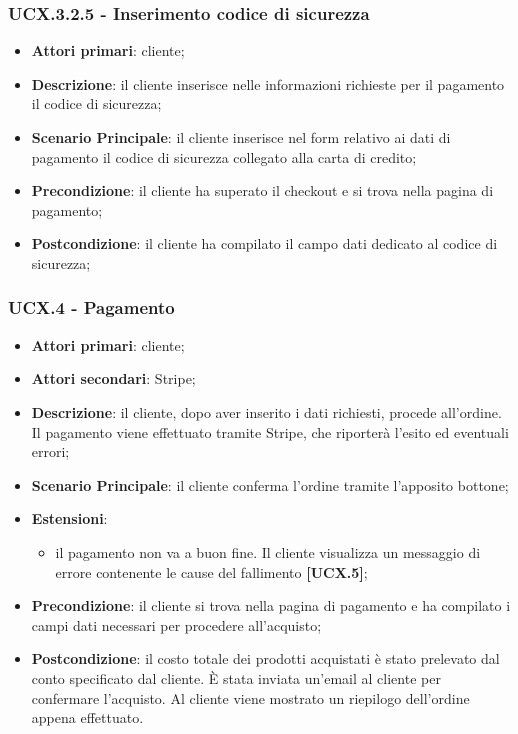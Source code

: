 \subsubsection{UCX.3.2.5 - Inserimento codice di sicurezza}
\begin{itemize}
\item \textbf{Attori primari}: cliente;
\item \textbf{Descrizione}: il cliente inserisce nelle informazioni richieste per il pagamento il codice di sicurezza;
\item \textbf{Scenario Principale}: il cliente inserisce nel form relativo ai dati di pagamento il codice di sicurezza collegato alla carta di credito;
\item \textbf{Precondizione}: il cliente ha superato il checkout e si trova nella pagina di pagamento;
\item \textbf{Postcondizione}: il cliente ha compilato il campo dati dedicato al codice di sicurezza;
\end{itemize}

\subsubsection{UCX.4 - Pagamento}
\begin{itemize}
\item \textbf{Attori primari}: cliente;
\item \textbf{Attori secondari}: Stripe;
\item \textbf{Descrizione}: il cliente, dopo aver inserito i dati richiesti, procede all'ordine. Il pagamento viene effettuato tramite Stripe, che riporterà l'esito ed eventuali errori;
\item \textbf{Scenario Principale}: il cliente conferma l'ordine tramite l'apposito bottone;
\item \textbf{Estensioni}:
\begin{itemize}
	\item il pagamento non va a buon fine. Il cliente visualizza un messaggio di errore contenente le cause del fallimento \textbf{[UCX.5]};
\end{itemize}
\item \textbf{Precondizione}: il cliente si trova nella pagina di pagamento e ha compilato i campi dati necessari per procedere all'acquisto;
\item \textbf{Postcondizione}: il costo totale dei prodotti acquistati è stato prelevato dal conto specificato dal cliente. È stata inviata un'email al cliente per confermare l'acquisto. Al cliente viene mostrato un riepilogo dell'ordine appena effettuato.
\end{itemize}

